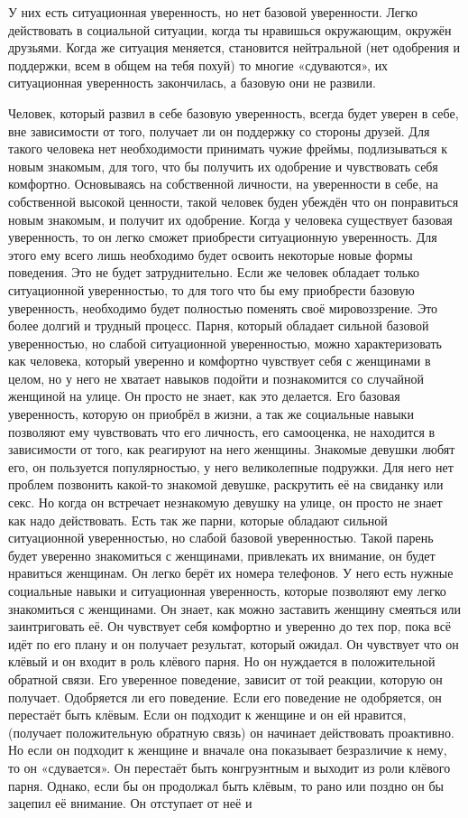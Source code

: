 У них есть ситуационная уверенность, но нет базовой уверенности. Легко действовать в социальной ситуации, когда ты нравишься окружающим, окружён друзьями. Когда же ситуация меняется, становится нейтральной (нет одобрения и поддержки, всем в общем на тебя похуй) то многие «сдуваются», их ситуационная уверенность закончилась, а базовую они не развили.

Человек, который развил в себе базовую уверенность, всегда будет уверен в себе, вне зависимости от того, получает ли он поддержку со стороны друзей. Для такого человека нет необходимости принимать чужие фреймы, подлизываться к новым знакомым, для того, что бы получить их одобрение и чувствовать себя комфортно. Основываясь на собственной личности, на уверенности в себе, на собственной высокой ценности, такой человек буден убеждён что он понравиться новым знакомым, и получит их одобрение. Когда у человека существует базовая уверенность, то он легко сможет приобрести ситуационную уверенность. Для этого ему всего лишь необходимо будет освоить некоторые новые формы поведения. Это не будет затруднительно. Если же человек обладает только ситуационной уверенностью, то для того что бы ему приобрести базовую уверенность, необходимо будет полностью поменять своё мировоззрение. Это более долгий и трудный процесс. Парня, который обладает сильной базовой уверенностью, но слабой ситуационной уверенностью, можно характеризовать как человека, который уверенно и комфортно чувствует себя с женщинами в целом, но у него не хватает навыков подойти и познакомится со случайной женщиной на улице. Он просто не знает, как это делается. Его базовая уверенность, которую он приобрёл в жизни, а так же социальные навыки позволяют ему чувствовать что его личность, его самооценка, не находится в зависимости от того, как реагируют на него женщины. Знакомые девушки любят его, он пользуется популярностью, у него великолепные подружки. Для него нет проблем позвонить какой-то знакомой девушке, раскрутить её на свиданку или секс. Но когда он встречает незнакомую девушку на улице, он просто не знает как надо действовать. Есть так же парни, которые обладают сильной ситуационной уверенностью, но слабой базовой уверенностью. Такой парень будет уверенно знакомиться с женщинами, привлекать их внимание, он будет нравиться женщинам. Он легко берёт их номера телефонов. У него есть нужные социальные навыки и ситуационная уверенность, которые позволяют ему легко знакомиться с женщинами. Он знает, как можно заставить женщину смеяться или заинтриговать её. Он чувствует себя комфортно и уверенно до тех пор, пока всё идёт по его плану и он получает результат, который ожидал. Он чувствует что он клёвый и он входит в роль клёвого парня. Но он нуждается в положительной обратной связи. Его уверенное поведение, зависит от той реакции, которую он получает. Одобряется ли его поведение. Если его поведение не одобряется, он перестаёт быть клёвым. Если он подходит к женщине и он ей нравится, (получает положительную обратную связь) он начинает действовать проактивно. Но если он подходит к женщине и вначале она показывает безразличие к нему, то он «сдувается». Он перестаёт быть конгруэнтным и выходит из роли клёвого парня. Однако, если бы он продолжал быть клёвым, то рано или поздно он бы зацепил её внимание. Он отступает от неё и 
